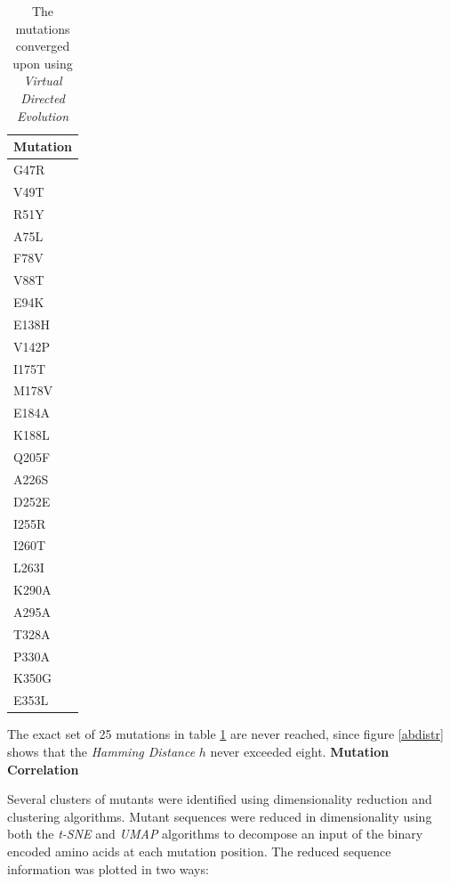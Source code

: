\documentclass[16pt]{book}
\begin{document}
\begin{table}
        \begin{center}
		\caption{\label{mxntab} The mutations converged upon using \textit{Virtual Directed Evolution}}
		\begin{tabular}{l}
		\textbf{Mutation} \\
	    \hline
             G47R \\
             V49T \\
             R51Y \\
             A75L \\
             F78V \\
             V88T \\
             E94K \\
            E138H \\
            V142P \\
            I175T \\
            M178V \\
            E184A \\
            K188L \\
            Q205F \\
            A226S \\
            D252E \\
            I255R \\
            I260T \\
            L263I \\
            K290A \\
            A295A \\
            T328A \\
            P330A \\
            K350G \\
            E353L \\
\end{tabular}
        \end{center}
\end{table}

The exact set of 25 mutations in table \ref{mxntab} are never reached, since figure \ref{abdistr} shows that the \textit{Hamming Distance} $h$ never exceeded eight.
\textbf{Mutation Correlation}

Several clusters of mutants were identified using dimensionality reduction and clustering algorithms.
Mutant sequences were reduced in dimensionality using both the \textit{t-SNE} \cite{van2008visualizing} and \textit{UMAP} \cite{mcinnes2018umap} algorithms to decompose an input of the binary encoded  amino acids at each mutation position.
The reduced sequence information was plotted in two ways:
\end{document}
